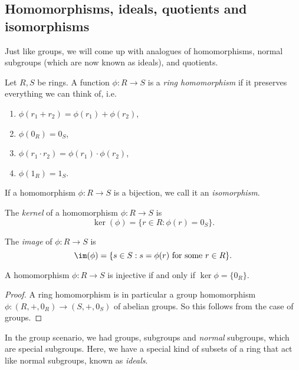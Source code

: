 \documentclass[a4paper]{article}
\begin{document}
\subsection{Homomorphisms, ideals, quotients and isomorphisms}
Just like groups, we will come up with analogues of homomorphisms, normal subgroups (which are now known as ideals), and quotients.

\begin{defi}
  Let $R, S$ be rings. A function $\phi: R \to S$ is a \emph{ring homomorphism} if it preserves everything we can think of, i.e.
  \begin{enumerate}
    \item $\phi(r_1 + r_2) = \phi(r_1) + \phi(r_2)$,
    \item $\phi(0_R) = 0_S$,
    \item $\phi(r_1 \cdot r_2) = \phi(r_1) \cdot \phi(r_2)$,
    \item $\phi(1_R) = 1_S$.
  \end{enumerate}
\end{defi}

\begin{defi}
  If a homomorphism $\phi: R \to S$ is a bijection, we call it an \emph{isomorphism}.
\end{defi}

\begin{defi}[Kernel]
  The \emph{kernel} of a homomorphism $\phi: R \to S$ is
  \[
    \ker (\phi) = \{r \in R: \phi(r) = 0_S\}.
  \]
\end{defi}

\begin{defi}[Image]
  The \emph{image} of $\phi: R \to S$ is
  \[
    \im(\phi) = \{s \in S: s = \phi(r) \text{ for some }r \in R\}.
  \]
\end{defi}

\begin{lemma}
  A homomorphism $\phi: R \to S$ is injective if and only if $\ker \phi = \{0_R\}$.
\end{lemma}

\begin{proof}
  A ring homomorphism is in particular a group homomorphism $\phi: (R, +, 0_R) \to (S, +, 0_S)$ of abelian groups. So this follows from the case of groups.
\end{proof}

In the group scenario, we had groups, subgroups and \emph{normal} subgroups, which are special subgroups. Here, we have a special kind of subsets of a ring that act like normal subgroups, known as \emph{ideals}.
\end{document}
